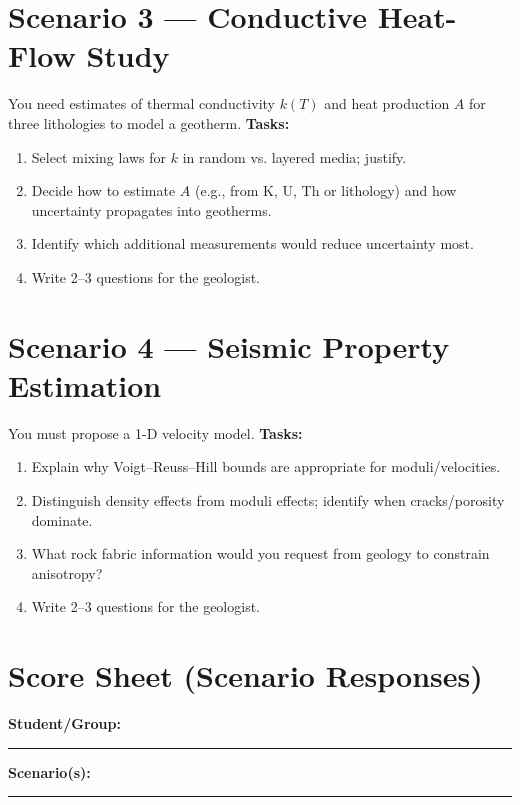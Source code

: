 \documentclass[11pt,a4paper]{article}
\begin{document}
\section*{Scenario 3 --- Conductive Heat-Flow Study}
You need estimates of thermal conductivity $k(T)$ and heat production $A$ for three lithologies to model a geotherm.\newline
\textbf{Tasks:}
\begin{enumerate}[leftmargin=*]
  \item Select mixing laws for $k$ in random vs. layered media; justify.
  \item Decide how to estimate $A$ (e.g., from K, U, Th or lithology) and how uncertainty propagates into geotherms.
  \item Identify which additional measurements would reduce uncertainty most.
  \item Write 2--3 questions for the geologist.
\end{enumerate}
\vspace{16pt}

\section*{Scenario 4 --- Seismic Property Estimation}
You must propose a 1-D velocity model.\newline
\textbf{Tasks:}
\begin{enumerate}[leftmargin=*]
  \item Explain why Voigt--Reuss--Hill bounds are appropriate for moduli/velocities.
  \item Distinguish density effects from moduli effects; identify when cracks/porosity dominate.
  \item What rock fabric information would you request from geology to constrain anisotropy?
  \item Write 2--3 questions for the geologist.
\end{enumerate}
\vspace{16pt}

\section*{Score Sheet (Scenario Responses)}
\noindent\textbf{Student/Group:} \rule{0.42\linewidth}{0.4pt} \hfill \textbf{Scenario(s):} \rule{0.35\linewidth}{0.4pt}
\end{document}

